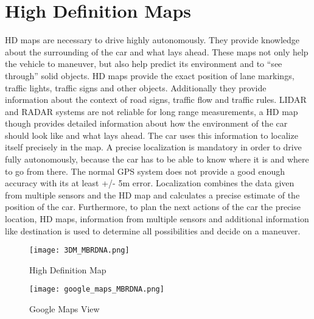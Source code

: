 \section{High Definition Maps}
\label{ml_hd}
\acf{HD} maps are necessary to drive highly autonomously. They provide knowledge about the surrounding of the car and what lays ahead. These maps not only help the vehicle to maneuver, but also help predict its environment and to \enquote{see through} solid objects. HD maps provide the exact position of lane markings, traffic lights, traffic signs and other objects. Additionally they provide information about the context of road signs, traffic flow and traffic rules. \ac{LIDAR} and \ac{RADAR} systems are not reliable for long range measurements, a HD map though provides detailed information about how the environment of the car should look like and what lays ahead. The car uses this information to localize itself precisely in the map. A precise localization is mandatory in order to drive fully autonomously, because the car has to be able to know where it is and where to go from there. The normal GPS system does not provide a good enough accuracy with its at least +/- 5m error. Localization combines the data given from multiple sensors and the HD map and calculates a precise estimate of the position of the car. Furthermore, to plan the next actions of the car the precise location, HD maps, information from multiple sensors and additional information like destination is used to determine all possibilities and decide on a maneuver.
\begin{figure}[!hbt]
\centering
\begin{minipage}[b]{0.49\textwidth}
\texttt{[image: 3DM\_MBRDNA.png]}
\caption{High Definition Map}
\label{3dm_mbrdna}
\end{minipage}
\hfill
\begin{minipage}[b]{0.49\textwidth}
\texttt{[image: google\_maps\_MBRDNA.png]}
\caption{Google Maps View}
\label{google_mbrdna}
\end{minipage}
\end{figure}
